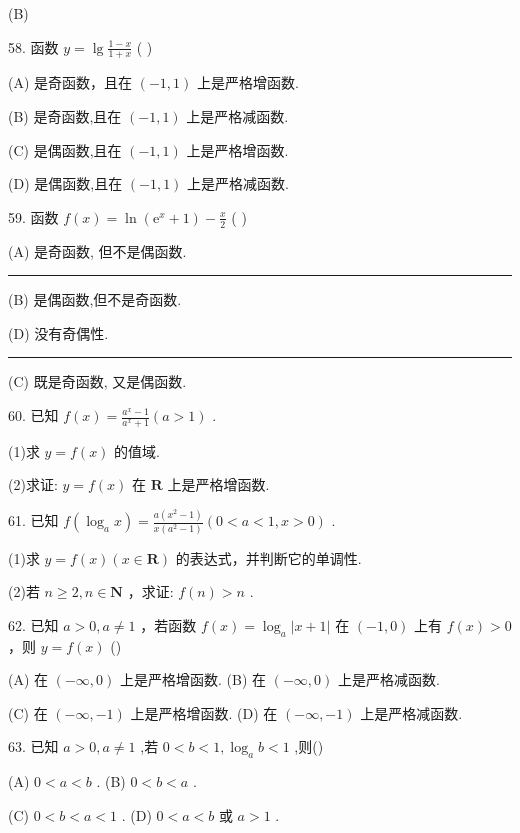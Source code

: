 \documentclass[10pt]{article}
\newcommand{\HRule}{\begin{center}\rule{0.9\linewidth}{0.2mm}\end{center}}
\begin{document}
(B)

58. 函数 \(y = \lg \frac{1 - x}{1 + x}\) ( )

(A) 是奇函数，且在 \(\left( {-1,1}\right)\) 上是严格增函数.

(B) 是奇函数,且在 \(\left( {-1,1}\right)\) 上是严格减函数.

(C) 是偶函数,且在 \(\left( {-1,1}\right)\) 上是严格增函数.

(D) 是偶函数,且在 \(\left( {-1,1}\right)\) 上是严格减函数.

59. 函数 \(f\left( x\right)  = \ln \left( {{\mathrm{e}}^{x} + 1}\right)  - \frac{x}{2}\) (   )

(A) 是奇函数, 但不是偶函数.

\HRule

(B) 是偶函数,但不是奇函数.

(D) 没有奇偶性.

\HRule

(C) 既是奇函数, 又是偶函数.

60. 已知 \(f\left( x\right)  = \frac{{a}^{x} - 1}{{a}^{x} + 1}\left( {a > 1}\right)\) .

(1)求 \(y = f\left( x\right)\) 的值域.

(2)求证: \(y = f\left( x\right)\) 在 \(\mathbf{R}\) 上是严格增函数.

61. 已知 \(f\left( {{\log }_{a}x}\right)  = \frac{a\left( {{x}^{2} - 1}\right) }{x\left( {{a}^{2} - 1}\right) }\left( {0 < a < 1,x > 0}\right)\) .

(1)求 \(y = f\left( x\right) \left( {x \in  \mathbf{R}}\right)\) 的表达式，并判断它的单调性.

(2)若 \(n \geq  2,n \in  \mathbf{N}\) ，求证: \(f\left( n\right)  > n\) .

62. 已知 \(a > 0,a \neq  1\) ，若函数 \(f\left( x\right)  = {\log }_{a}\left| {x + 1}\right|\) 在 \(\left( {-1,0}\right)\) 上有 \(f\left( x\right)  > 0\) ，则 \(y = f\left( x\right)\) ()

(A) 在 \(\left( {-\infty ,0}\right)\) 上是严格增函数. (B) 在 \(\left( {-\infty ,0}\right)\) 上是严格减函数.

(C) 在 \(\left( {-\infty , - 1}\right)\) 上是严格增函数. (D) 在 \(\left( {-\infty , - 1}\right)\) 上是严格减函数.

63. 已知 \(a > 0,a \neq  1\) ,若 \(0 < b < 1,{\log }_{a}b < 1\) ,则()

(A) \(0 < a < b\) . (B) \(0 < b < a\) .

(C) \(0 < b < a < 1\) . (D) \(0 < a < b\) 或 \(a > 1\) .
\end{document}
